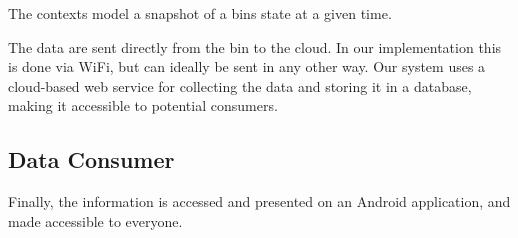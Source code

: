 The contexts model a snapshot of a bins state at a given time.

The data are sent directly from the bin to the cloud. In our implementation this is done via WiFi, but can ideally be sent in any other way.
Our system uses a cloud-based web service for collecting the data and storing it in a database, making it accessible to potential consumers.

\subsection{Data Consumer}
Finally, the information is accessed and presented on an Android application, and made accessible to everyone. 